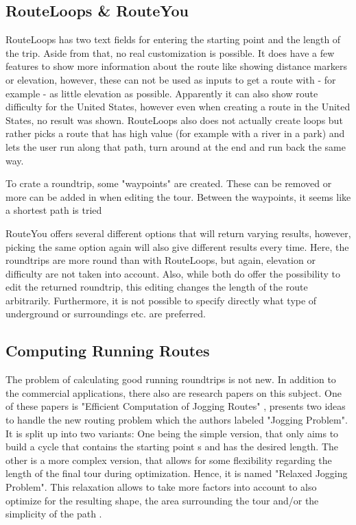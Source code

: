 \subsection{RouteLoops \& RouteYou}
\label{subsec:routeLoopsrouteYou}
RouteLoops has two text fields for entering the starting point and the length of the trip.
Aside from that, no real customization is possible.
It does have a few features to show more information about the route like showing distance markers or elevation, however, these can not be used as inputs to get a route with - for example - as little elevation as possible.
Apparently it can also show route difficulty for the United States, however even when creating a route in the United States, no result was shown. 
RouteLoops also does not actually create loops but rather picks a route that has high value (for example with a river in a park) and lets the user run along that path, turn around at the end and run back the same way.

To crate a roundtrip, some "waypoints" are created. 
These can be removed or more can be added in when editing the tour.
Between the waypoints, it seems like a shortest path is tried 

RouteYou offers several different options that will return varying results, however, picking the same option again will also give different results every time.   
Here, the roundtrips are more round than with RouteLoops, but again, elevation or difficulty are not taken into account. 
Also, while both do offer the possibility to edit the returned roundtrip, this editing changes the length of the route arbitrarily.
Furthermore, it is not possible to specify directly what type of underground or surroundings etc. are preferred. 

\subsection{Computing Running Routes}
\label{subsec:runningRoutes}

The problem of calculating good running roundtrips is not new.
In addition to the commercial applications, there also are research papers on this subject.
One of these papers is "Efficient Computation of Jogging Routes" \cite{gemsa_efficient_2013}, presents two ideas to handle the new routing problem which the authors labeled "Jogging Problem".
It is split up into two variants: 
One being the simple version, that only aims to build a cycle that contains the starting point s and has the desired length.
The other is a more complex version, that allows for some flexibility regarding the length of the final tour during optimization. 
Hence, it is named "Relaxed Jogging Problem". 
This relaxation allows to take more factors into account to also optimize for the resulting shape, the area surrounding the tour and/or the simplicity of the path \cite{gemsa_efficient_2013}. 

